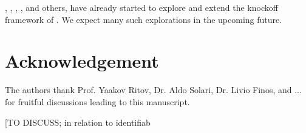 \documentclass[article,lineno]{biometrika}
\begin{document}
\cite{DaiknockofffilterFDR2016}, \cite{JansonFamilywiseerrorrate2016}, \cite{ChenAnalysisKnockoffFilter2017}, \cite{ChenPseudoKnockoffFilter2017}, and others, have already started to explore and extend the knockoff framework of \cite{BarberControllingfalsediscovery2015}.
We expect many such explorations in the upcoming future.



\section*{Acknowledgement}
The authors thank Prof. Yaakov Ritov, Dr. Aldo Solari, Dr. Livio Finos, and ... for fruitful discussions leading to this manuscript.


[TO DISCUSS; in relation to identifiab



\end{document}
